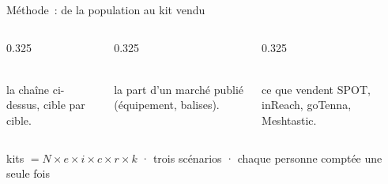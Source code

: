 \begin{frame}{Méthode~: de la population au kit vendu}
  \vspace{0.05cm}
  \begin{columns}[T]
    \begin{column}{0.325\textwidth}
      \begin{carte}[height=1.35cm,valign=top]
        \raggedright{}\\[1pt]{\footnotesize la chaîne ci-dessus, cible par cible.}
      \end{carte}
    \end{column}
    \begin{column}{0.325\textwidth}
      \begin{carte}[height=1.35cm,valign=top]
        \raggedright{}\\[1pt]{\footnotesize la part d'un marché publié (équipement, balises).}
      \end{carte}
    \end{column}
    \begin{column}{0.325\textwidth}
      \begin{carte}[height=1.35cm,valign=top]
        \raggedright{}\\[1pt]{\footnotesize ce que vendent SPOT, inReach, goTenna, Meshtastic.}
      \end{carte}
    \end{column}
  \end{columns}
  \vspace{0.05cm}
  \begin{pcompact}\centering\footnotesize
    kits $= N\times e\times i\times c\times r\times k$ · trois scénarios · chaque personne comptée une seule fois
  \end{pcompact}
\end{frame}

